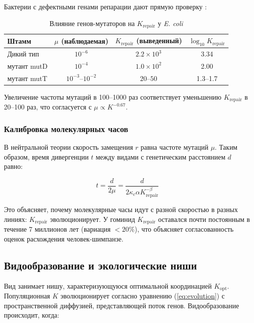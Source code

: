 \documentclass[12pt,a4paper]{article}
\theoremstyle{remark}
\newcommand{\Keffopt}{K_{\mathrm{opt}}}
\newcommand{\kappac}{\kappa_c}
\begin{document}
	Бактерии с дефектными генами репарации дают прямую проверку \cite{Drake1991}:
	
	\begin{table}[htbp]
		\centering
		\caption{Влияние генов-мутаторов на $K_{\text{repair}}$ у \textit{E. coli} \cite{Drake1991}}
		\label{tab:mutators}
		\small
		\begin{tabular}{lccc}
			\toprule
			\textbf{Штамм} & $\mu$ (наблюдаемая) & $K_{\text{repair}}$ (выведенный) & $\log_{10} K_{\text{repair}}$ \\
			\midrule
			Дикий тип & $10^{-6}$ & $2.2 \times 10^3$ & 3.34 \\
			мутант mutD & $10^{-4}$ & $1.0 \times 10^2$ & 2.00 \\
			мутант mutT & $10^{-3}$--$10^{-2}$ & $20$--$50$ & 1.3--1.7 \\
			\bottomrule
		\end{tabular}
	\end{table}
	
	Увеличение частоты мутаций в 100–1000 раз соответствует уменьшению $K_{\text{repair}}$ в 20–100 раз, что согласуется с $\mu \propto K^{-0.67}$.
	
	\subsubsection{Калибровка молекулярных часов}
	
	В нейтральной теории скорость замещения $r$ равна частоте мутаций $\mu$. Таким образом, время дивергенции $t$ между видами с генетическим расстоянием $d$ равно:
	
	\begin{equation}
		t = \frac{d}{2\mu} = \frac{d}{2\kappac \alpha K_{\text{repair}}^{-\beta}}
		\label{eq:molecular-clock}
	\end{equation}
	
	Это объясняет, почему молекулярные часы идут с разной скоростью в разных линиях: $K_{\text{repair}}$ эволюционирует. У гоминид $K_{\text{repair}}$ оставался почти постоянным в течение 7 миллионов лет (вариация $<20\%$), что объясняет согласованность оценок расхождения человек-шимпанзе.
	
	\subsection{Видообразование и экологические ниши}
	
	Вид занимает нишу, характеризующуюся оптимальной координацией $\Keffopt$. Популяционная $K$ эволюционирует согласно уравнению (\ref{eq:evolution}) с пространственной диффузией, представляющей поток генов. Видообразование происходит, когда:
	
\end{document}
